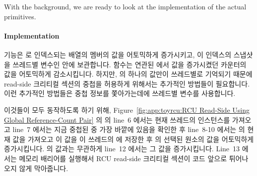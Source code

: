 With the background, we are ready to look at the implementation of the
actual primitives.
\fi

\paragraph{Implementation}

 기능은  로 인덱스되는  배열의
멤버의 값을 어토믹하게 증가시키고, 이 인덱스의 스냅샷을 쓰레드별 변수인
 안에 보관합니다.
 함수는 연관된  에서 값을 증가시켰던
카운터의 값을 어토믹하게 감소시킵니다.
하지만,  의 하나의 값만이 쓰레드별로 기억되기 때문에 read-side
크리티컬 섹션의 중첩을 허용하게 위해서는 추가적인 방법들이 필요합니다.
이런 추가적인 방법들은 중첩 정보를 쫓아가는데에 쓰레드별 
변수를 사용합니다.
\iffalse

The \co{rcu_read_lock()} primitive atomically increments the member of the
\co{rcu_refcnt[]} pair indexed by \co{rcu_idx}, and keeps a
snapshot of this index in the per-thread variable \co{rcu_read_idx}.
The \co{rcu_read_unlock()} primitive then atomically decrements
whichever counter of the pair that the corresponding \co{rcu_read_lock()}
incremented.
However, because only one value of \co{rcu_idx} is remembered per thread,
additional measures must be taken to permit nesting.
These additional measures use the per-thread \co{rcu_nesting} variable
to track nesting.
\fi

이것들이 모두 동작하도록 하기 위해,
Figure~\ref{fig:app:toyrcu:RCU Read-Side Using Global Reference-Count Pair}
의  의 line~6 에서는 현재 쓰레드의 
인스턴스를 가져오고 line~7 에서는 지금 중첩된  중 가장
바깥에 있음을 확인한 후 line~8-10 에서는  의 현재 값을 가져오고 이
값을 이 쓰레드의  에 저장한 후  의 선택된
원소의 값을 어토믹하게 증가시킵니다.
 의 값과는 무관하게 line~12 에서는 그 값을 증가시킵니다.
Line~13 에서는 메모리 배리어를 실행해서 RCU read-side 크리티컬 섹션이
 코드 앞으로 튀어나오지 않게 막아줍니다.
\iffalse

To make all this work, line~6 of \co{rcu_read_lock()} in
Figure~\ref{fig:app:toyrcu:RCU Read-Side Using Global Reference-Count Pair}
picks up the
current thread's instance of \co{rcu_nesting}, and if line~7 finds
that this is the outermost \co{rcu_read_lock()},
then lines~8-10 pick up the current value of
\co{rcu_idx}, save it in this thread's instance of \co{rcu_read_idx},
and atomically increment the selected element of \co{rcu_refcnt}.
Regardless of the value of \co{rcu_nesting}, line~12 increments it.
Line~13 executes a memory barrier to ensure that the RCU read-side
critical section does not bleed out before the \co{rcu_read_lock()} code.
\fi

